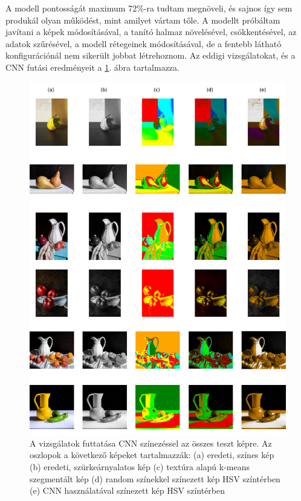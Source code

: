 A modell pontosságát maximum 72\%-ra tudtam megnöveli, és sajnos így sem produkál olyan működést, mint amilyet vártam tőle. A modellt próbáltam javítani a képek módosításával, a tanító halmaz növelésével, csökkentésével, az adatok szűrésével, a modell rétegeinek módosításával, de a fentebb látható konfigurációnál nem sikerült jobbat létrehoznom. Az eddigi vizsgálatokat, és a CNN futási eredményeit a \ref{fig:result_all}. ábra tartalmazza.

\begin{figure}[h]
\centering
\includegraphics[scale=0.5]{images/result_all.png}
\caption{A vizsgálatok futtatása CNN színezéssel az összes teszt képre. Az oszlopok a következő képeket tartalmazzák: (a) eredeti, színes kép (b) eredeti, szürkeárnyalatos kép (c) textúra alapú k-means szegmentált kép (d) random színekkel színezett kép HSV színtérben (e) CNN használatával színezett kép HSV színtérben }
\label{fig:result_all}
\end{figure}

